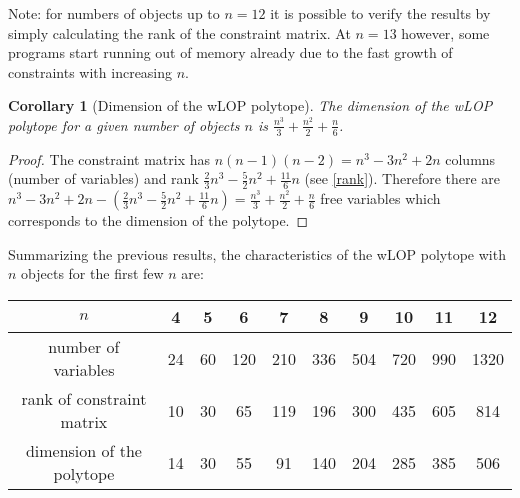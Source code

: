 \documentclass{scrartcl}
\newtheorem{corollary}{Corollary}
\theoremstyle{plain}
\begin{document}
Note: for numbers of objects up to $n=12$ it is possible to verify the results by simply calculating the rank of the constraint matrix. At $n=13$ however, some programs start running out of memory already due to the fast growth of constraints with increasing $n$.

\begin{mdframed}
\begin{corollary}[Dimension of the wLOP polytope]
	The dimension of the wLOP polytope for a given number of objects $n$ is $\frac{n^3}{3}+ \frac{n^2}{2} + \frac{n}{6}$.
\end{corollary}
\vspace{7pt}
\end{mdframed}

\begin{proof}
	The constraint matrix has $n(n-1)(n-2)=n^3-3n^2+2n$ columns (number of variables) and rank $\frac{2}{3}n^3-\frac{5}{2}n^2+\frac{11}{6}n$ (see \ref{rank}). Therefore there are $n^3-3n^2+2n - (\frac{2}{3}n^3-\frac{5}{2}n^2+\frac{11}{6}n) = \frac{n^3}{3}+ \frac{n^2}{2} + \frac{n}{6}$ free variables which corresponds to the dimension of the polytope.
\end{proof}

Summarizing the previous results, the characteristics of the wLOP polytope with $n$ objects for the first few $n$ are:

\begin{center}
	\begin{tabular}{||c | c c c c c c c c c||} 
		\hline
		$n$ & 4 & 5 & 6 & 7 & 8 & 9 & 10 & 11 & 12\\ [0.5ex] 
		\hline\hline
		number of variables & 24 & 60 & 120 & 210 & 336 & 504 & 720 & 990 & 1320 \\
		\hline
		rank of constraint matrix & 10 & 30 & 65 & 119 & 196 & 300 & 435 & 605 & 814 \\ 
		\hline
		dimension of the polytope & 14 & 30 & 55 & 91 & 140 & 204 & 285 & 385 & 506 \\
		\hline
	\end{tabular}
\end{center}
\end{document}
